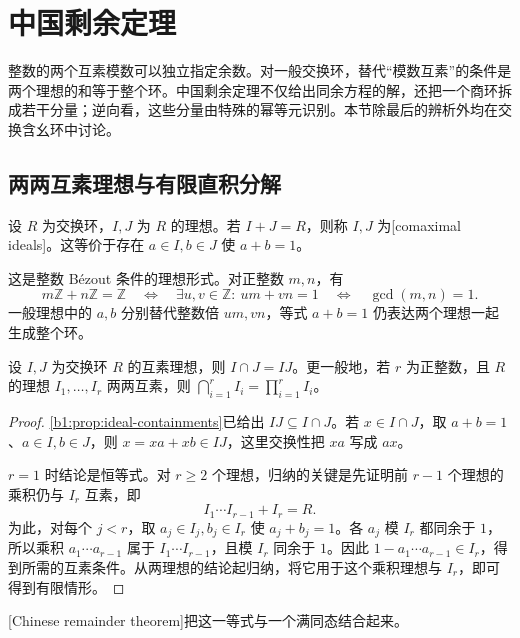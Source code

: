 
\section{中国剩余定理}
\label{b1:sec:1004}

整数的两个互素模数可以独立指定余数。对一般交换环，替代“模数互素”的条件是两个理想的和等于整个环。中国剩余定理不仅给出同余方程的解，还把一个商环拆成若干分量；逆向看，这些分量由特殊的幂等元识别。本节除最后的辨析外均在交换含幺环中讨论。

%
%
%

\subsection{两两互素理想与有限直积分解}
\label{b1:subsec:1004:01}
\begin{definition}\label{b1:def:comaximal-ideals}
	设 \(R\) 为交换环，\(I,J\) 为 \(R\) 的理想。若 \(I+J=R\)，则称 \(I,J\) 为[comaximal ideals]。这等价于存在 \(a\in I,b\in J\) 使 \(a+b=1\)。
\end{definition}

这是整数 Bézout 条件的理想形式。对正整数 \(m,n\)，有
\[
	m\mathbb Z+n\mathbb Z=\mathbb Z \quad\Longleftrightarrow\quad \exists u,v\in\mathbb Z:\ um+vn=1 \quad\Longleftrightarrow\quad \gcd(m,n)=1.
\]
一般理想中的 \(a,b\) 分别替代整数倍 \(um,vn\)，等式 \(a+b=1\) 仍表达两个理想一起生成整个环。

\begin{lemma}\label{b1:lem:comaximal-product}
	设 \(I,J\) 为交换环 \(R\) 的互素理想，则 \(I\cap J=IJ\)。更一般地，若 \(r\) 为正整数，且 \(R\) 的理想 \(I_1,\ldots,I_r\) 两两互素，则 \(\bigcap_{i=1}^r I_i=\prod_{i=1}^r I_i\)。
\end{lemma}
\begin{proof}
	\cref{b1:prop:ideal-containments}已给出 \(IJ\subseteq I\cap J\)。若 \(x\in I\cap J\)，取 \(a+b=1\)、\(a\in I,b\in J\)，则 \(x=xa+xb\in IJ\)，这里交换性把 \(xa\) 写成 \(ax\)。

	\(r=1\) 时结论是恒等式。对 \(r\ge2\) 个理想，归纳的关键是先证明前 \(r-1\) 个理想的乘积仍与 \(I_r\) 互素，即
	\[
		I_1\cdots I_{r-1}+I_r=R.
	\]
	为此，对每个 \(j<r\)，取 \(a_j\in I_j,b_j\in I_r\) 使 \(a_j+b_j=1\)。各 \(a_j\) 模 \(I_r\) 都同余于 \(1\)，所以乘积 \(a_1\cdots a_{r-1}\) 属于 \(I_1\cdots I_{r-1}\)，且模 \(I_r\) 同余于 \(1\)。因此 \(1-a_1\cdots a_{r-1}\in I_r\)，得到所需的互素条件。从两理想的结论起归纳，将它用于这个乘积理想与 \(I_r\)，即可得到有限情形。
\end{proof}
[Chinese remainder theorem]把这一等式与一个满同态结合起来。

